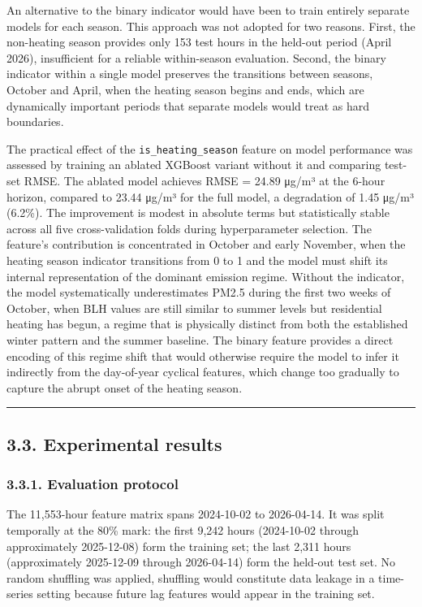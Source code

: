 An alternative to the binary indicator would have been to train entirely separate models for each season. This approach was not adopted for two reasons. First, the non-heating season provides only 153 test hours in the held-out period (April 2026), insufficient for a reliable within-season evaluation. Second, the binary indicator within a single model preserves the transitions between seasons, October and April, when the heating season begins and ends, which are dynamically important periods that separate models would treat as hard boundaries.

The practical effect of the \texttt{is\_heating\_season} feature on model performance was assessed by training an ablated XGBoost variant without it and comparing test-set RMSE. The ablated model achieves RMSE = 24.89 μg/m³ at the 6-hour horizon, compared to 23.44 μg/m³ for the full model, a degradation of 1.45 μg/m³ (6.2\%). The improvement is modest in absolute terms but statistically stable across all five cross-validation folds during hyperparameter selection. The feature's contribution is concentrated in October and early November, when the heating season indicator transitions from 0 to 1 and the model must shift its internal representation of the dominant emission regime. Without the indicator, the model systematically underestimates PM2.5 during the first two weeks of October, when BLH values are still similar to summer levels but residential heating has begun, a regime that is physically distinct from both the established winter pattern and the summer baseline. The binary feature provides a direct encoding of this regime shift that would otherwise require the model to infer it indirectly from the day-of-year cyclical features, which change too gradually to capture the abrupt onset of the heating season.

\begin{center}\rule{0.5\linewidth}{0.5pt}\end{center}

\subsection{3.3. Experimental results}\label{experimental-results}

\subsubsection{3.3.1. Evaluation protocol}\label{evaluation-protocol}

The 11,553-hour feature matrix spans 2024-10-02 to 2026-04-14. It was split temporally at the 80\% mark: the first 9,242 hours (2024-10-02 through approximately 2025-12-08) form the training set; the last 2,311 hours (approximately 2025-12-09 through 2026-04-14) form the held-out test set. No random shuffling was applied, shuffling would constitute data leakage in a time-series setting because future lag features would appear in the training set.

